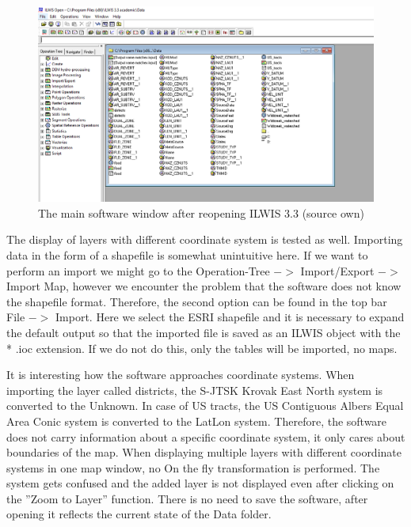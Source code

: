 \documentclass[a4paper,10pt,twoside]{article}
\begin{document}
\vspace{0.3cm}
\begin{figure}[hbt!] 
\begin{center}
\includegraphics[width=15cm]{../pictures/ilwis_uvodni_okno.png} 
\caption[The main software window after reopening ILWIS 3.3 (source own)]{The main software window after reopening ILWIS 3.3 (source own)}
\label{fig:ilwis_uvodni_okno}
\end{center}
\end{figure}

\noindent The display of layers with different coordinate system is tested as well. Importing data in the form of a shapefile is somewhat unintuitive here. If we want to perform an import we might go to the Operation-Tree $->$ Import/Export $->$ Import Map, however we encounter the problem that the software does not know the shapefile format. Therefore, the second option can be found in the top bar File $->$ Import. Here we select the ESRI shapefile and it is necessary to expand the default output so that the imported file is saved as an ILWIS object with the * .ioc extension. If we do not do this, only the tables will be imported, no maps.

It is interesting how the software approaches coordinate systems. When importing the layer called districts, the S-JTSK Krovak East North system is converted to the Unknown. In case of US tracts, the US Contiguous Albers Equal Area Conic system is converted to the LatLon system. Therefore, the software does not carry information about a specific coordinate system, it only cares about boundaries of the map. When displaying multiple layers with different coordinate systems in one map window, no On the fly transformation is performed. The system gets confused and the added layer is not displayed even after clicking on the ''Zoom to Layer'' function. There is no need to save the software, after opening it reflects the current state of the Data folder.
\end{document}
